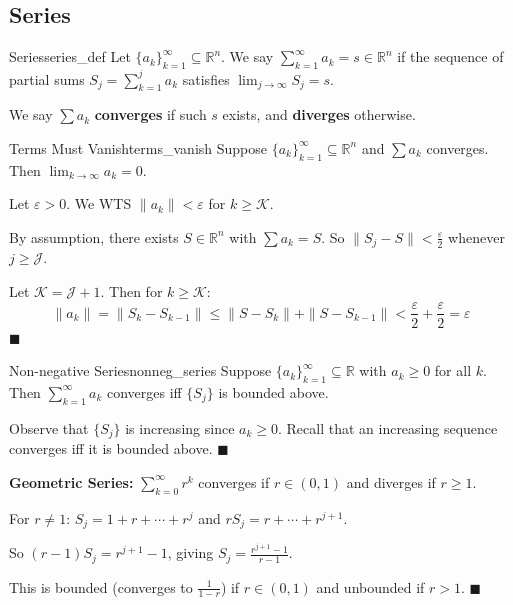 \documentclass[11pt, letterpaper, openany]{book}
\renewenvironment{proof}[1][\proofname]{%
  \tcolorbox[blanker, breakable, left=1em,
    before skip=1em, after skip=1em,
    borderline west={2pt}{0pt}{MagicTeal!50},
    colback=MagicCream,
    before upper={\textcolor{MagicTeal}{\sffamily\bfseries #1.}\space}
  ]%
}{%
  \hfill\textcolor{MagicTeal}{\ensuremath{\blacksquare}}\endtcolorbox%
}
\begin{document}
\subsection{Series}

\begin{defn}{Series}{series_def}
Let $\{a_k\}_{k=1}^\infty \subseteq \mathbb{R}^n$. We say $\sum_{k=1}^\infty a_k = s \in \mathbb{R}^n$ if the sequence of partial sums $S_j = \sum_{k=1}^j a_k$ satisfies $\lim_{j\to\infty} S_j = s$.

We say $\sum a_k$ \textbf{converges} if such $s$ exists, and \textbf{diverges} otherwise.
\end{defn}

\begin{thm}{Terms Must Vanish}{terms_vanish}
Suppose $\{a_k\}_{k=1}^\infty \subseteq \mathbb{R}^n$ and $\sum a_k$ converges. Then $\lim_{k\to\infty} a_k = 0$.
\end{thm}

\begin{proof}
Let $\varepsilon > 0$. We WTS $\|a_k\| < \varepsilon$ for $k \geq \mathcal{K}$.

By assumption, there exists $S \in \mathbb{R}^n$ with $\sum a_k = S$. So $\|S_j - S\| < \frac{\varepsilon}{2}$ whenever $j \geq \mathcal{J}$.

Let $\mathcal{K} = \mathcal{J} + 1$. Then for $k \geq \mathcal{K}$:
\[\|a_k\| = \|S_k - S_{k-1}\| \leq \|S - S_k\| + \|S - S_{k-1}\| < \frac{\varepsilon}{2} + \frac{\varepsilon}{2} = \varepsilon\]
\end{proof}

\begin{thm}{Non-negative Series}{nonneg_series}
Suppose $\{a_k\}_{k=1}^\infty \subseteq \mathbb{R}$ with $a_k \geq 0$ for all $k$. Then $\sum_{k=1}^\infty a_k$ converges iff $\{S_j\}$ is bounded above.
\end{thm}

\begin{proof}
Observe that $\{S_j\}$ is increasing since $a_k \geq 0$. Recall that an increasing sequence converges iff it is bounded above.
\end{proof}

\begin{example}
\textbf{Geometric Series:} $\sum_{k=0}^\infty r^k$ converges if $r \in (0,1)$ and diverges if $r \geq 1$.

\begin{proof}
For $r \neq 1$: $S_j = 1 + r + \cdots + r^j$ and $rS_j = r + \cdots + r^{j+1}$.

So $(r-1)S_j = r^{j+1} - 1$, giving $S_j = \frac{r^{j+1} - 1}{r - 1}$.

This is bounded (converges to $\frac{1}{1-r}$) if $r \in (0,1)$ and unbounded if $r > 1$.
\end{proof}
\end{example}
\end{document}
